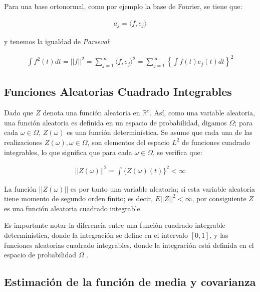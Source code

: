 \documentclass[
]{book}
\begin{document}
Para una base ortonormal, como por ejemplo la base de Fourier, se tiene que:

\begin{align}
    a_j=\langle f,e_j \rangle
\end{align}

y tenemos la igualdad de \emph{Parseval}:

\begin{align}
    \int f^2 (t) dt = ||f||^2 = \sum_{j=1}^{\infty} {\langle f,e_j \rangle ^2} = \sum_{j=1}^{\infty} \left\{\int f(t)e_{j}(t) dt\right\}^2
\end{align}

\hypertarget{funciones-aleatorias-cuadrado-integrables}{%
\subsection{\texorpdfstring{\textbf{Funciones Aleatorias Cuadrado Integrables}}{Funciones Aleatorias Cuadrado Integrables}}\label{funciones-aleatorias-cuadrado-integrables}}

Dado que \(Z\) denota una función aleatoria en \(\mathbb{R^d}\). Así, como una variable aleatoria, una función aleatoria es definida en un espacio de probabilidad, digamos \(\Omega\); para cada \(\omega \in \Omega\), \(Z(\omega)\) es una función determinística. Se asume que cada una de las realizaciones \(Z(\omega),\omega \in \Omega\), son elementos del espacio \(L^2\) de funciones cuadrado integrables, lo que significa que para cada \(\omega\in \Omega\), se verifica que:

\begin{align}
    ||Z(\omega)||^2=\int \{ Z(\omega)(t)\}^2<\infty
\end{align}

La función \(||Z(\omega)||\) es por tanto una variable aleatoria; si esta variable aleatoria tiene momento de segundo orden finito; es decir, \(E||Z||^2<\infty\), por consiguiente \(Z\) es una función aleatoria cuadrado integrable.

Es importante notar la diferencia entre una función cuadrado integrable determinística, donde la integración se define en el intervalo \([0,1]\), y las funciones aleatorias cuadrado integrables, donde la integración está definida en el espacio de probabilidad \(\Omega\) \citep{kokoska}.

\hypertarget{estimaciuxf3n-de-la-funciuxf3n-de-media-y-covarianza}{%
\subsection{\texorpdfstring{\textbf{Estimación de la función de media y covarianza}}{Estimación de la función de media y covarianza}}\label{estimaciuxf3n-de-la-funciuxf3n-de-media-y-covarianza}}
\end{document}
